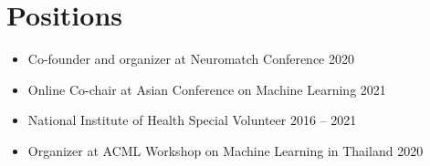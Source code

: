 \section{\sc Positions}

\begin{itemize}[leftmargin=0cm, label={}]
\itemsep0em

\item Co-founder and organizer at Neuromatch Conference \hfill 2020

\item Online Co-chair at Asian Conference on Machine Learning \hfill 2021

\item National Institute of Health Special Volunteer \hfill 2016 -- 2021

\item Organizer at ACML Workshop on Machine Learning in Thailand \hfill 2020

\end{itemize}
